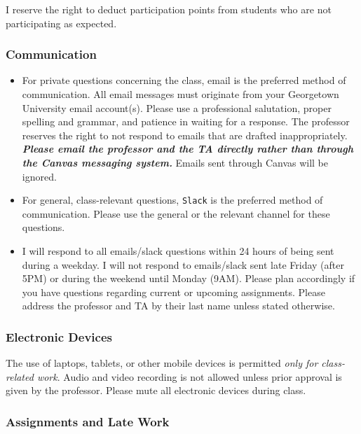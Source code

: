 \documentclass[
  12pt,
]{article}
\begin{document}
I reserve the right to deduct participation points from students who are
not participating as expected.

\hypertarget{communication}{%
\subsubsection{Communication}\label{communication}}

\begin{itemize}
\item
  For private questions concerning the class, email is the preferred
  method of communication. All email messages must originate from your
  Georgetown University email account(s). Please use a professional
  salutation, proper spelling and grammar, and patience in waiting for a
  response. The professor reserves the right to not respond to emails
  that are drafted inappropriately. \textbf{\emph{Please email the
  professor and the TA directly rather than through the Canvas messaging
  system.}} Emails sent through Canvas will be ignored.
\item
  For general, class-relevant questions, \texttt{Slack} is the preferred
  method of communication. Please use the general or the relevant
  channel for these questions.
\item
  I will respond to all emails/slack questions within 24 hours of being
  sent during a weekday. I will not respond to emails/slack sent late
  Friday (after 5PM) or during the weekend until Monday (9AM). Please
  plan accordingly if you have questions regarding current or upcoming
  assignments. Please address the professor and TA by their last name
  unless stated otherwise.
\end{itemize}

\hypertarget{electronic-devices}{%
\subsubsection{Electronic Devices}\label{electronic-devices}}

The use of laptops, tablets, or other mobile devices is permitted
\emph{only for class-related work}. Audio and video recording is not
allowed unless prior approval is given by the professor. Please mute all
electronic devices during class.

\hypertarget{assignments-and-late-work}{%
\subsubsection{Assignments and Late
Work}\label{assignments-and-late-work}}
\end{document}
